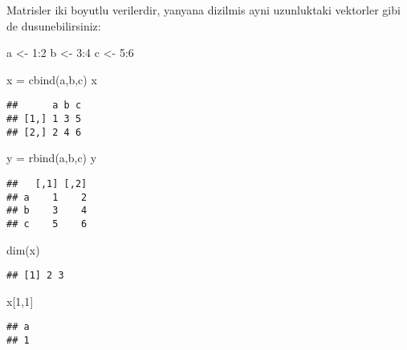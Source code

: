 \documentclass[
]{book}
\newenvironment{Shaded}{\begin{snugshade}}{\end{snugshade}}
\newcommand{\DecValTok}[1]{\textcolor[rgb]{0.00,0.00,0.81}{#1}}
\newcommand{\FunctionTok}[1]{\textcolor[rgb]{0.00,0.00,0.00}{#1}}
\newcommand{\NormalTok}[1]{#1}
\newcommand{\OtherTok}[1]{\textcolor[rgb]{0.56,0.35,0.01}{#1}}
\newcommand{\SpecialCharTok}[1]{\textcolor[rgb]{0.00,0.00,0.00}{#1}}
\begin{document}
Matrisler iki boyutlu verilerdir, yanyana dizilmis ayni uzunluktaki vektorler gibi de dusunebilirsiniz:

\begin{Shaded}
\begin{Highlighting}[]
\NormalTok{a }\OtherTok{\textless{}{-}} \DecValTok{1}\SpecialCharTok{:}\DecValTok{2}
\NormalTok{b }\OtherTok{\textless{}{-}} \DecValTok{3}\SpecialCharTok{:}\DecValTok{4}
\NormalTok{c }\OtherTok{\textless{}{-}} \DecValTok{5}\SpecialCharTok{:}\DecValTok{6}
\end{Highlighting}
\end{Shaded}

\begin{Shaded}
\begin{Highlighting}[]
\NormalTok{x }\OtherTok{=} \FunctionTok{cbind}\NormalTok{(a,b,c)}
\NormalTok{x}
\end{Highlighting}
\end{Shaded}

\begin{verbatim}
##      a b c
## [1,] 1 3 5
## [2,] 2 4 6
\end{verbatim}

\begin{Shaded}
\begin{Highlighting}[]
\NormalTok{y }\OtherTok{=} \FunctionTok{rbind}\NormalTok{(a,b,c)}
\NormalTok{y}
\end{Highlighting}
\end{Shaded}

\begin{verbatim}
##   [,1] [,2]
## a    1    2
## b    3    4
## c    5    6
\end{verbatim}

\begin{Shaded}
\begin{Highlighting}[]
\FunctionTok{dim}\NormalTok{(x)}
\end{Highlighting}
\end{Shaded}

\begin{verbatim}
## [1] 2 3
\end{verbatim}

\begin{Shaded}
\begin{Highlighting}[]
\NormalTok{x[}\DecValTok{1}\NormalTok{,}\DecValTok{1}\NormalTok{]}
\end{Highlighting}
\end{Shaded}

\begin{verbatim}
## a 
## 1
\end{verbatim}
\end{document}
